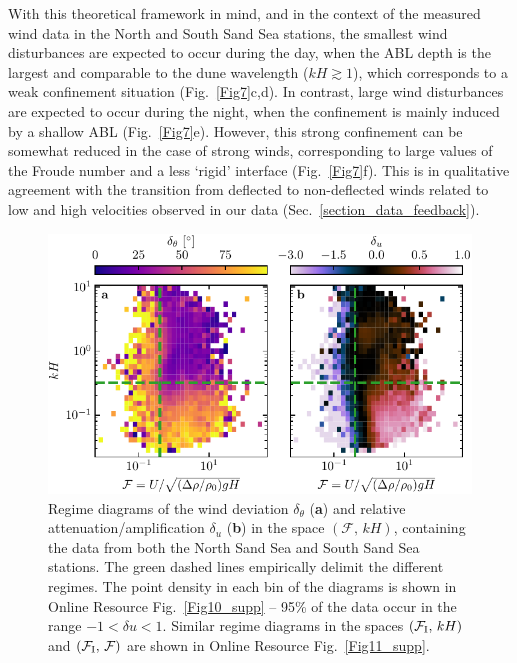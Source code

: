 With this theoretical framework in mind, and in the context of the measured wind data in the North and South Sand Sea stations, the smallest wind disturbances are expected to occur during the day, when the ABL depth is the largest and comparable to the dune wavelength ($k H \gtrsim 1$), which corresponds to a weak confinement situation (Fig.~\ref{Fig7}c,d). In contrast, large wind disturbances are expected to occur during the night, when the confinement is mainly induced by a shallow ABL (Fig.~\ref{Fig7}e). However, this strong confinement can be somewhat reduced in the case of strong winds, corresponding to large values of the Froude number and a less `rigid' interface (Fig.~\ref{Fig7}f). This is in qualitative agreement with the transition from deflected to non-deflected winds related to low and high velocities observed in our data (Sec.~\ref{section_data_feedback}).


\begin{figure}
\centering
\includegraphics[scale=1]{Figures/Figure8.pdf}
\caption{Regime diagrams of the wind deviation $\delta_{\theta}$ (\textbf{a}) and relative attenuation/amplification $\delta_{u}$ (\textbf{b}) in the space $(\mathcal{F}, \, kH)$, containing the data from both the North Sand Sea and South Sand Sea stations. The green dashed lines empirically delimit the different regimes. The point density in each bin of the diagrams is shown in Online Resource Fig.~\ref{Fig10_supp} -- 95\% of the data occur in the range $-1 < \delta u < 1$. Similar regime diagrams in the spaces $(\mathcal{F}_{\textup{I}}, \, kH)$ and $(\mathcal{F}_{\textup{I}}, \, \mathcal{F})$ are shown in Online Resource Fig.~\ref{Fig11_supp}.}
\label{Fig8}
\end{figure}


